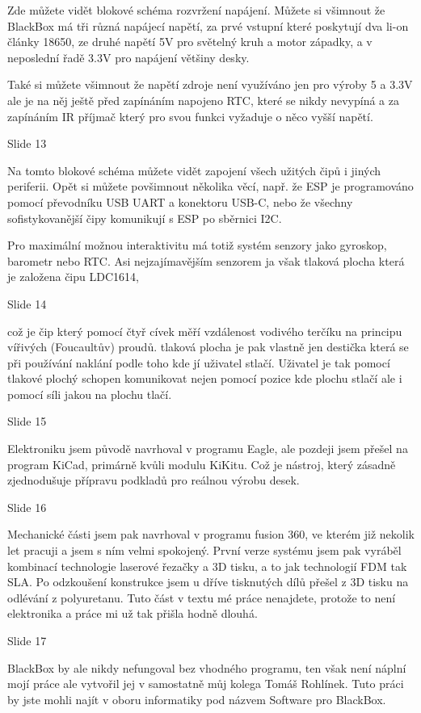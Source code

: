 Zde můžete vidět blokové schéma rozvržení napájení.
Můžete si všimnout že BlackBox má tři různá napájecí napětí, za prvé vstupní které poskytují dva li-on články 18650, 
ze druhé napětí 5V pro světelný kruh a motor západky, a v neposlední řadě 3.3V pro napájení většiny desky.

Také si můžete všimnout že napětí zdroje není využíváno jen pro výroby 5 a 3.3V ale je na něj ještě před zapínáním 
napojeno RTC, které se nikdy nevypíná a za zapínáním IR příjmač který pro svou funkci vyžaduje o něco vyšší napětí.

Slide 13

Na tomto blokové schéma můžete vidět zapojení všech užitých čipů i jiných periferii.
Opět si můžete povšimnout několika věcí, např. že ESP je programováno pomocí převodníku USB UART a konektoru USB-C,
nebo že všechny sofistykovanější čipy komunikují s ESP po sběrnici I2C.

Pro maximální možnou interaktivitu má totiž systém senzory jako gyroskop, barometr nebo RTC. 
Asi nejzajímavějším senzorem ja však tlaková plocha která je založena čipu LDC1614, 

Slide 14

což je čip který 
pomocí čtyř cívek měří vzdálenost vodivého terčíku na principu vířivých (Foucaultův) proudů. tlaková plocha je pak vlastně 
jen destička která se při používání naklání podle toho kde jí uživatel stlačí. Uživatel je tak pomocí tlakové plochý
schopen komunikovat nejen pomocí pozice kde plochu stlačí ale i pomocí síli jakou na plochu tlačí. 



Slide 15

Elektroniku jsem původě navrhoval v programu Eagle, ale pozdeji jsem přešel na program KiCad, primárně kvůli 
modulu KiKitu. Což je nástroj, který zásadně zjednodušuje přípravu podkladů pro reálnou výrobu desek. 

Slide 16

Mechanické části jsem pak navrhoval v programu fusion 360, ve kterém již nekolik let pracuji a jsem s ním velmi spokojený.
První verze systému jsem pak vyráběl kombinací technologie laserové řezačky a 3D tisku, a to jak technologií FDM tak SLA.
Po odzkoušení konstrukce jsem u dříve tisknutých dílů přešel z 3D tisku na odlévání z polyuretanu. 
Tuto část v textu mé práce nenajdete, protože
to není elektronika a práce mi už tak přišla hodně dlouhá.

Slide 17

BlackBox by ale nikdy nefungoval bez vhodného programu, ten však není náplní mojí práce ale vytvořil jej v samostatně 
můj kolega Tomáš Rohlínek. Tuto práci by jste mohli najít v oboru informatiky pod názvem Software pro BlackBox.

